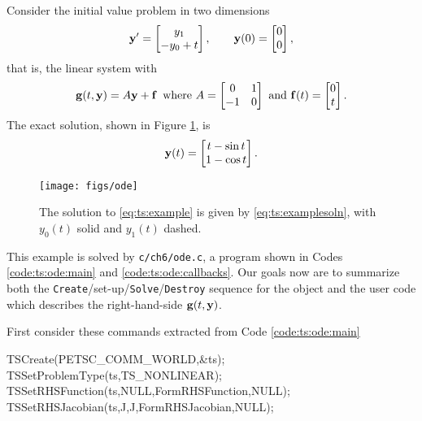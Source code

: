 \noindent\hrulefill
\begin{example}  Consider the initial value problem in two dimensions
\begin{equation}
   \mathbf{y}' = \begin{bmatrix} y_1 \\ - y_0 + t\end{bmatrix}, \qquad \mathbf{y}(0) = \begin{bmatrix} 0 \\ 0 \end{bmatrix}, \label{eq:ts:example}
\end{equation}
that is, the linear system with
    $$\mathbf{g}(t,\mathbf{y}) = A \mathbf{y} + \mathbf{f} \,\text{ where } A = \begin{bmatrix} 0 & 1 \\ -1 & 0 \end{bmatrix} \text{ and } \mathbf{f}(t) = \begin{bmatrix} 0 \\ t\end{bmatrix}.$$
The exact solution, shown in Figure \ref{fig:ts:ode}, is
\begin{equation}
    \mathbf{y}(t) = \begin{bmatrix} t - \sin t \\ 1 - \cos t \end{bmatrix}.\label{eq:ts:examplesoln}
\end{equation}

\vspace{-3mm}
\begin{figure}
\texttt{[image: figs/ode]}
\caption{The solution to \eqref{eq:ts:example} is given by \eqref{eq:ts:examplesoln}, with $y_0(t)$ solid and $y_1(t)$ dashed.}
\label{fig:ts:ode}
\end{figure}
\end{example}
\vspace{-5mm}
\noindent\hrulefill

\bigskip

This example is solved by \texttt{c/ch6/ode.c}, a program shown in Codes \ref{code:ts:ode:main} and \ref{code:ts:ode:callbacks}.  Our goals now are to summarize both the \texttt{Create}/set-up/\texttt{Solve}/\texttt{Destroy} sequence for the \pTS object and the user code which describes the right-hand-side $\mathbf{g}(t,\mathbf{y})$.

First consider these commands extracted from Code \ref{code:ts:ode:main}
\begin{code}
  TSCreate(PETSC_COMM_WORLD,&ts);
  TSSetProblemType(ts,TS_NONLINEAR);
  TSSetRHSFunction(ts,NULL,FormRHSFunction,NULL);
  TSSetRHSJacobian(ts,J,J,FormRHSJacobian,NULL);
\end{code}

